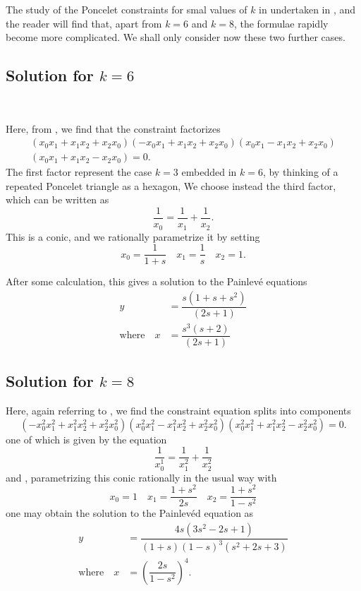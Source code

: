 The study of the Poncelet constraints for smal values of $k$ in undertaken in \cite{art7-key1}, and the reader will find that, apart from $k=6$ and $k=8$, the formulae
rapidly become more complicated. We shall only consider now these two further cases.

\subsection{Solution for $k=6$}\label{art7-subsec-6.4}
~

Here, from \cite{art7-key1}, we find that the constraint factorizes
\begin{equation*}
\begin{split}
(x_{0}x_{1} + x_{1}x_{2} +x_{2}x_{0})(-x_{0}x_{1}+x_{1}x_{2}+x_{2}x_{0})(x_{0}x_{1}-x_{1}x_{2}+x_{2}x_{0})\\
(x_{0}x_{1}+x_{1}x_{2}-x_{2}x_{0})=0.
\end{split}
\end{equation*}
The first factor represent the case $k=3$ embedded in $k=6$, by thinking of a repeated Poncelet triangle as a hexagon, We choose instead the third factor, which can be written as
$$
\dfrac{1}{x_{0}} = \dfrac{1}{x_{1}}+\dfrac{1}{x_{2}}.
$$
This is a conic, and we rationally parametrize it by setting
$$
x_{0}=\dfrac{1}{1+s} \quad x_{1}=\dfrac{1}{s}\quad x_{2}=1.
$$ 

After some calculation, this gives a solution to the Painlev\'e equations
\begin{align*}
y&=\dfrac{s(1+s+s^{2})}{(2s+1)}\\
\text{where} \quad x &= \dfrac{s^{3}(s+2)}{(2s+1)}
\end{align*}

\subsection{Solution for $k=8$}\label{art7-subsec-6.5}

Here, again referring to \cite{art7-key1}, we find the constraint equation splits into components
$$
(-x_{0}^{2}x_{1}^{2} + x_{1}^{2}x_{2}^{2} + x_{2}^{2}x_{0}^{2})(x_{0}^{2}x_{1}^{2} - x_{1}^{2}x_{2}^{2}+x_{2}^{2}x_{0}^{2})
(x_{0}^{2}x_{1}^{2} + x_{1}^{2}x_{2}^{2} - x_{2}^{2}x_{0}^{2}) =0.
$$
one of which is given by the equation
$$
\dfrac{1}{x_{0}^{1}}= \dfrac{1}{x_{1}^{2}}+\dfrac{1}{x_{2}^{2}}
$$
and , parametrizing this conic rationally in the usual way with
$$
x_{0}=1 \quad x_{1}=\dfrac{1+s^{2}}{2s} \quad x_{2}= \dfrac{1+s^{2}}{1-s^{2}}
$$
one may obtain the solution to the Painlev\'ed equation as
\begin{align*}
y&= \dfrac{4s(3s^{2}-2s+1)}{(1+s)(1-s)^{3}(s^{2}+2s+3)}\\
\text{where} \quad x &= \left(\dfrac{2s}{1-s^{2}}\right)^{4}.
\end{align*}


